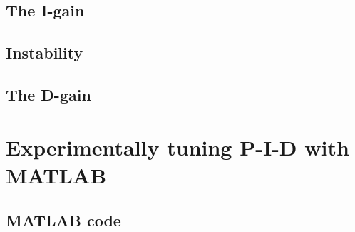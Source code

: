 \documentclass{article}
\theoremstyle{definition}
\begin{document}
\subsection{The I-gain}



\subsection{Instability}

\subsection{The D-gain}




\section{Experimentally tuning P-I-D with MATLAB}



\subsection{MATLAB code}
\end{document}
